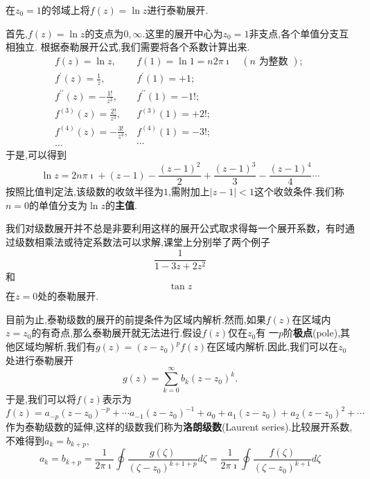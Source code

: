 \begin{example}
在$z_0=1$的邻域上将$f(z) = \ln{z}$进行泰勒展开.
\end{example}
\begin{solution}
    首先,$f(z) = \ln z $的支点为$0,\infty$.这里的展开中心为$z_0=1$非支点,各个单值分支互相独立.
    根据泰勒展开公式,我们需要将各个系数计算出来.
    \[
        \begin{array}{ll}
            f(z)=\ln z, & f(1)=\ln 1=n 2 \pi \imath \quad(n \text { 为整数 }) \text {; } \\
            f^{\prime}(z)=\frac{1}{z}, & f^{\prime}(1)=+1 ; \\
            f^{\prime \prime}(z)=-\frac{1 !}{z^2}, & f^{\prime \prime}(1)=-1 ! ; \\
            f^{(3)}(z)=\frac{2 !}{z^3}, & f^{(3)}(1)=+2 ! ; \\
            f^{(4)}(z)=-\frac{3 !}{z^4}, & f^{(4)}(1)=-3 ! ; \\
            \ldots & \cdots
            \end{array}
    \]
    于是,可以得到
    \[
    \ln z = 2 n \pi \imath + (z-1) - \frac{(z-1)^2}{2} +  \frac{(z-1)^3}{3} -  \frac{(z-1)^4}{4} \cdots
    \]
    按照比值判定法,该级数的收敛半径为$1$,需附加上$|z-1|< 1$这个收敛条件.我们称$n=0$的单值分支为$\ln z $的\textbf{主值}.
\end{solution}
我们对级数展开并不总是非要利用这样的展开公式取求得每一个展开系数，有时通过级数相乘法或待定系数法可以求解,课堂上分别举了两个例子
$$
\frac{1}{1-3z + 2z^2}
$$
和$$
\tan{z}
$$
在$z=0$处的泰勒展开.

目前为止,泰勒级数的展开的前提条件为区域内解析.然而,如果$f(z)$在区域内$z=z_0$的有奇点,那么泰勒展开就无法进行.假设$f(z)$仅在$z_0$有
一$p$阶\textbf{极点}(pole),其他区域均解析,我们有$g(z) = (z-z_0)^p f(z)$在区域内解析.因此,我们可以在$z_0$处进行泰勒展开
\begin{equation}
    g(z) = \sum_{k=0}^{\infty} b_k (z-z_0)^{k} .
\end{equation}
于是,我们可以将$f(z)$表示为
\begin{equation}
    f(z) = a_{-p} (z-z_0)^{-p} + \cdots a_{-1}(z-z_0)^{-1} + a_0 + a_{1} (z-z_0) + a_{2} (z-z_0)^2 + \cdots 
\end{equation}
作为泰勒级数的延伸,这样的级数我们称为\textbf{洛朗级数}(Laurent series).比较展开系数,不难得到$a_k = b_{k+p}$,
\begin{equation}
    a_k = b_{k+p} = \frac{1}{2\pi \imath} \oint \frac{g(\zeta)}{(\zeta - z_0)^{k+1+p}} d\zeta 
    = \frac{1}{2\pi \imath} \oint \frac{f(\zeta)}{(\zeta - z_0)^{k+1}} d\zeta
\end{equation}

